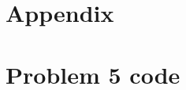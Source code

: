 \documentclass[11pt]{article}
\begin{document}
 

\newpage
\section*{Appendix}
\section*{Problem 5 code}
\label{q5code}

\end{document}
